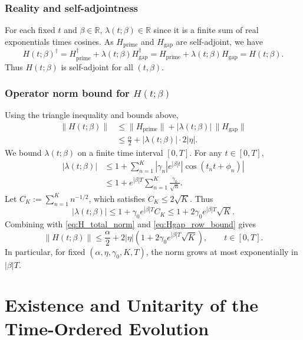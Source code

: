 \documentclass[11pt]{article}
\begin{document}
\subsubsection{Reality and self-adjointness}

For each fixed $t$ and $\beta\in\mathbb{R}$, $\lambda(t;\beta)\in\mathbb{R}$ since it is a finite sum of real exponentials times cosines. As $H_{\mathrm{prime}}$ and $H_{\mathrm{gap}}$ are self-adjoint, we have
\[
H(t;\beta)^\dagger = H_{\mathrm{prime}}^\dagger + \lambda(t;\beta)H_{\mathrm{gap}}^\dagger = H_{\mathrm{prime}} + \lambda(t;\beta)H_{\mathrm{gap}} = H(t;\beta).
\]
Thus $H(t;\beta)$ is self-adjoint for all $(t,\beta)$.

\subsubsection{Operator norm bound for $H(t;\beta)$}

Using the triangle inequality and bounds above,
\begin{align}
\|H(t;\beta)\|
&\le \|H_{\mathrm{prime}}\| + |\lambda(t;\beta)|\,\|H_{\mathrm{gap}}\|\nonumber\\
&\le \frac{\alpha}{2} + |\lambda(t;\beta)| \cdot 2|\eta|.\label{eq:H_total_norm}
\end{align}
We bound $\lambda(t;\beta)$ on a finite time interval $[0,T]$. For any $t\in[0,T]$,
\begin{align}
|\lambda(t;\beta)|
&\le 1 + \sum_{n=1}^K |\gamma_n| e^{|\beta| t} |\cos(t_nt + \phi_n)|\nonumber\\
&\le 1 + e^{|\beta| T}\sum_{n=1}^K \frac{\gamma_0}{\sqrt{n}}.\label{eq:lambda_bound}
\end{align}
Let $C_K := \sum_{n=1}^K n^{-1/2}$, which satisfies $C_K\le 2\sqrt{K}$. Thus
\begin{equation}
|\lambda(t;\beta)| \le 1 + \gamma_0 e^{|\beta| T} C_K
\le 1 + 2\gamma_0 e^{|\beta| T}\sqrt{K}.
\end{equation}
Combining with \eqref{eq:H_total_norm} and \eqref{eq:Hgap_row_bound} gives
\begin{equation}
\|H(t;\beta)\| \le \frac{\alpha}{2} + 2|\eta|\left(1 + 2\gamma_0 e^{|\beta| T}\sqrt{K}\right),\qquad t\in[0,T].
\end{equation}
In particular, for fixed $(\alpha,\eta,\gamma_0,K,T)$, the norm grows at most exponentially in $|\beta|T$.

\section{Existence and Unitarity of the Time-Ordered Evolution}
\end{document}
